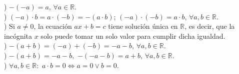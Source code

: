 ) $-(-a)=a$, $\forall a\in\mathbb{R}$. \\

) $(-a)\cdot b=a\cdot(-b)=-(a\cdot b)$; \hspace{8px} $(-a)\cdot(-b)=a\cdot b$, $\forall a,b\in\mathbb{R}$. \\

) Si $a\neq 0$, la ecuación $ax+b=c$ tiene solución única en $\mathbb{R}$, es decir, que la incógnita $x$ solo puede tomar un solo valor para cumplir dicha igualdad. \\

) $-(a+b)=(-a)+(-b)=-a-b$, $\forall a,b\in\mathbb{R}$. \\

) $-(a+b)=-a-b,$ $-(-a-b)=a+b$, $\forall a,b\in\mathbb{R}$. \\

) $\forall a,b\in\mathbb{R}:$ $a\cdot b=0\Leftrightarrow a=0\vee b=0$. \\

